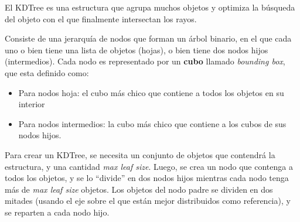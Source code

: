 El KDTree es una estructura que agrupa muchos objetos y optimiza la búsqueda del
objeto con el que finalmente intersectan los rayos.

Consiste de una jerarquía de nodos que forman un árbol binario, en el que cada
uno o bien tiene una lista de objetos (hojas), o bien tiene dos nodos hijos
(intermedios). Cada nodo es representado por un \textbf{cubo} llamado
\textit{bounding box}, que esta definido como:

\begin{itemize}
    \item Para nodos hoja: el cubo más chico que contiene a todos los objetos en su interior
    \item Para nodos intermedios: la cubo más chico que contiene a los cubos de
        sus nodos hijos.
\end{itemize}

Para crear un KDTree, se necesita un conjunto de objetos que contendrá la
estructura, y una cantidad \textit{max leaf size}. Luego, se crea un nodo que
contenga a todos los objetos, y se lo ``divide'' en dos nodos hijos mientras
cada nodo tenga más de \textit{max leaf size} objetos. Los objetos del nodo
padre se dividen en dos mitades (usando el eje sobre el que están mejor
distribuidos como referencia), y se reparten a cada nodo hijo.


